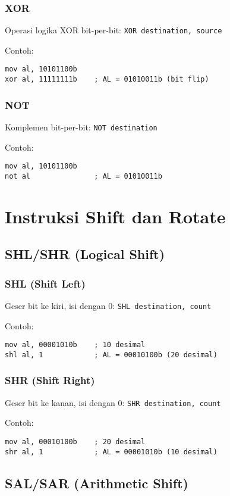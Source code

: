 \documentclass[../main.tex]{subfiles}
\begin{document}
\subsubsection{XOR}
Operasi logika XOR bit-per-bit: \texttt{XOR destination, source}

Contoh:
\begin{verbatim}
mov al, 10101100b
xor al, 11111111b    ; AL = 01010011b (bit flip)
\end{verbatim}

\subsubsection{NOT}
Komplemen bit-per-bit: \texttt{NOT destination}

Contoh:
\begin{verbatim}
mov al, 10101100b
not al               ; AL = 01010011b
\end{verbatim}

\section{Instruksi Shift dan Rotate}\label{sec:instruksi-dasar-shift}
\subsection{SHL/SHR (Logical Shift)}
\subsubsection{SHL (Shift Left)}
Geser bit ke kiri, isi dengan 0: \texttt{SHL destination, count}

Contoh:
\begin{verbatim}
mov al, 00001010b    ; 10 desimal
shl al, 1            ; AL = 00010100b (20 desimal)
\end{verbatim}

\subsubsection{SHR (Shift Right)}
Geser bit ke kanan, isi dengan 0: \texttt{SHR destination, count}

Contoh:
\begin{verbatim}
mov al, 00010100b    ; 20 desimal
shr al, 1            ; AL = 00001010b (10 desimal)
\end{verbatim}

\subsection{SAL/SAR (Arithmetic Shift)}
\end{document}
